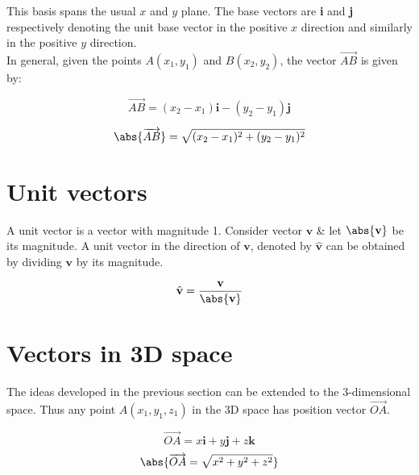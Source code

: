 \documentclass{standalone}
\begin{document}
	
	This basis spans the usual $x$ and $y$ plane. The base vectors are \textbf{i} and \textbf{j} respectively denoting the unit base vector in the positive $x$ direction and similarly in the positive $y$ direction.\\
	
	In general, given the points $A(x_1,y_1)$ and $B(x_2,y_2)$, the vector $\overrightarrow{AB}$ is given by:	
	
	
	\begin{center}
		\begin{tcolorbox}[center title,hbox,    %
			lifted shadow={1mm}{-2mm}{3mm}{0.1mm}%
			{black!50!white}]
			\begin{varwidth}{\textwidth}
				\begin{center}
					$$\overrightarrow{AB} = (x_2 -x_1)\textbf{i} - (y_2 -y_1)\textbf{j}$$
					
					$$	\abs{\overrightarrow{AB}} = \sqrt{(x_2 -x_1)^2 + (y_2 -y_1)^2}$$
				\end{center}
			\end{varwidth}
		\end{tcolorbox} 
	\end{center}
	\newpage
	\section{Unit vectors}
	
	
	
	A unit vector is a vector with magnitude 1. Consider vector $\textbf{v}$ \& let $\abs{\textbf{v}}$ be its magnitude. A unit vector in the direction of $\textbf{v}$, denoted by $\hat{\textbf{v}}$ can be obtained by dividing $\textbf{v}$ by its magnitude.
	
	$$\hat{\textbf{v}} = \frac{\textbf{v}}{\abs{\textbf{v}}}$$
	
	
	\section{Vectors in 3D space}
	
	The ideas developed in the previous section can be extended to the 3-dimensional space. Thus any point $A(x_1,y_1,z_1)$ in the 3D space has position vector $\overrightarrow{OA}$.
	\begin{center}
		\begin{tcolorbox}[center title,hbox,    %
			lifted shadow={1mm}{-2mm}{3mm}{0.1mm}%
			{black!50!white}]
			\begin{varwidth}{\textwidth}
				\begin{center}
					$$\overrightarrow{OA} = x\textbf{i} + y\textbf{j} +z\textbf{k}$$
					$$\abs{\overrightarrow{OA} = \sqrt{x^2 + y^2 + z^2}}$$
				\end{center}
			\end{varwidth}
		\end{tcolorbox} 
	\end{center}
	
\end{document}
